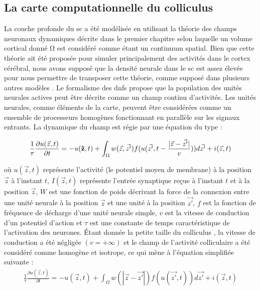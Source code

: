 \subsection{La carte computationnelle du colliculus}

La couche profonde du \gls{sc} a été modélisée en utilisant la théorie des champs neuronaux dynamiques \cite{Amari:1977, Taylor:1999} décrite dans le premier chapitre selon laquelle un volume cortical donné Ω est considéré comme étant un continuum spatial. Bien que cette théorie ait été proposée pour simuler principalement des activités dans le cortex cérébral, nous avons supposé que la densité neurale dans le \gls{sc} est assez élevée pour nous permettre de transposer cette théorie, comme supposé dans plusieurs autres modèles \cite{Trappenberg:2001, Schneider:2002, Marino:2012}. Le formalisme des \glspl{dnf} propose que la population des unités neurales actives peut être décrite comme un champ continu d'activités. Les unités neurales, comme éléments de la carte, peuvent être considérées comme un ensemble de processeurs homogènes fonctionnant en parallèle sur les signaux entrants. La dynamique du champ est régie par une équation du type :

\begin{align*}
	\frac{1}{\tau} \frac{\partial u({ \vec{z}},t)}{\partial t}
	 = - u({\bf \vec{z}},t)
 	 + \int_{\Omega}^{} w({ \vec{z}},{\vec{z'}})f(u({ \vec{z'}}, t - \frac{|{ \vec{z}-\vec{z'}}|}{v}))d{\vec{z'}}
     + i({\vec{z}},t) 
\end{align*}


o\`u  $u(\vec{z}, t)$ représente l'activité (le potentiel moyen de membrane) à la position $\vec{z}$ à l'instant $t$, $I(\vec{z},t)$ représente l'entrée synaptique reçue à l'instant $t$ et à la position $\vec{z}$, $W$ est une fonction de poids décrivant la force de la connexion entre une unité neurale à la position $\vec{z}$ et une unité à la position $\vec{z'}$, $f$ est la fonction de fréquence de décharge d'une unité neurale simple, $v$ est la vitesse de conduction d'un potentiel d'action et $\tau$ est une constante de temps caractéristique de l'activation des neurones. \'Etant donnée la petite taille du colliculus , la vitesse de conduction a été négligée $(v=+\infty)$ et le champ de l'activité colliculaire a été considéré comme homogène et isotrope, ce qui mène à l'équation simplifiée suivante :\\
\begin{align}
	\frac{1}{\tau} \frac{\partial u({\vec{z}},t)}{\partial t}
	 = - u({ \vec{z}},t)
 	 + \int_{\Omega}^{} w(|{\vec{z}}-{\vec{z'}}|)f(u({\vec{z'}}, t))d{ \vec{z'}}
     + i({\vec{z}},t)
  \label{eq: neural_field}
\end{align}

